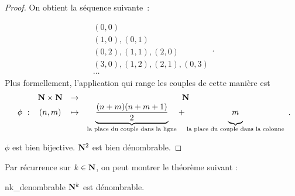 \documentclass[a4paper,french,final]{memoir}
\begin{document}
\begin{proof}
	On obtient la séquence suivante~:

	\[\begin{array}{l}
		(0,0) \\
		(1,0), (0,1) \\ %
		(0,2), (1,1), (2,0) \\
		(3,0), (1,2), (2,1), (0,3) \\
		\cdots
	\end{array}.\]
	Plus formellement, l'application qui range les couples de cette manière est
	\[\begin{array}{cccc}
		\ & \NN \times \NN & \to & \NN \\
		\phi~: & (n,m) & \mapsto & {\underbrace{\frac{(n+m)(n+m+1)}{2}}_{\text{la place du couple dans la ligne}}} +  {\underbrace{\vphantom{\frac{(n+m)(n+m+1)}{2}} m}_{\text{la place du couple dans la colonne}}}
	\end{array}.\]


	$\phi$ est bien bijective. $\mathbf{N}^2$ est bien dénombrable.
\end{proof}


Par récurrence sur $k \in \mathbf{N}$, on peut montrer le théorème suivant :
\begin{theoremb}{}{nk_denombrable}
    $\mathbf{N}^k$ est dénombrable.
\end{theoremb}
\end{document}
